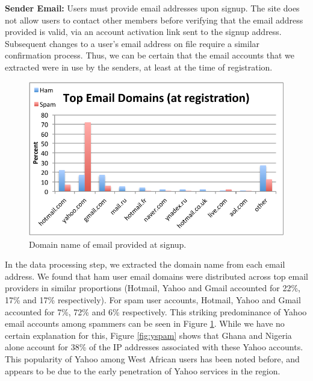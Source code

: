 \documentclass[preprint]{acm_proc_article-sp}
\begin{document}
\textbf{Sender Email:} Users must provide email addresses upon signup. The site does not allow users to contact other 
members before verifying that the email address provided is valid, via an account activation link sent to the signup 
address. Subsequent changes to a user's email address on file require a similar confirmation process. Thus, we can be certain 
that the email accounts that we extracted were in use by the senders, at least at the time of registration. 

\begin{figure}[h]
    \centering
    \includegraphics[width=\linewidth]{figures/email.pdf}
    \caption{Domain name of email provided at signup.}
    \label{fig:email}
\end{figure}

In the data processing step, we extracted the domain name from each email address. We found that ham user email domains 
were distributed across top email providers in similar proportions (Hotmail, Yahoo and Gmail accounted for 22\%, 17\% and 17\% 
respectively). For spam user accounts, Hotmail, Yahoo and Gmail accounted for 7\%, 72\% and 6\% respectively. This striking 
predominance of Yahoo email accounts among spammers can be seen in Figure \ref{fig:email}. While we have no certain 
explanation for this, Figure \ref{fig:yspam} shows that Ghana and Nigeria alone account for 38\% of the IP 
addresses associated with these Yahoo accounts. This popularity of Yahoo among West African users has 
been noted before\cite{burrell}, and appears to be due to the early penetration of Yahoo services in the region.
\end{document}
